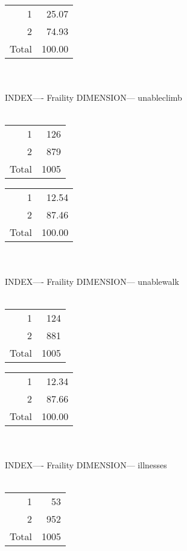 \documentclass[11pt]{article}
\begin{document}
% 
\begin{tabular}{rr}
   \hline
1 & 25.07 \\ 
  2 & 74.93 \\ 
  Total & 100.00 \\ 
   \hline
\end{tabular}
\\\\ 
INDEX---- Fraility DIMENSION--- unableclimb 
 \\\\ 
% 
\begin{tabular}{rr}
   \hline
1 & 126 \\ 
  2 & 879 \\ 
  Total & 1005 \\ 
   \hline
\end{tabular}
% 
\begin{tabular}{rr}
   \hline
1 & 12.54 \\ 
  2 & 87.46 \\ 
  Total & 100.00 \\ 
   \hline
\end{tabular}
\\\\ 
INDEX---- Fraility DIMENSION--- unablewalk 
 \\\\ 
% 
\begin{tabular}{rr}
   \hline
1 & 124 \\ 
  2 & 881 \\ 
  Total & 1005 \\ 
   \hline
\end{tabular}
% 
\begin{tabular}{rr}
   \hline
1 & 12.34 \\ 
  2 & 87.66 \\ 
  Total & 100.00 \\ 
   \hline
\end{tabular}
\\\\ 
INDEX---- Fraility DIMENSION--- illnesses 
 \\\\ 
% 
\begin{tabular}{rr}
   \hline
1 &  53 \\ 
  2 & 952 \\ 
  Total & 1005 \\ 
   \hline
\end{tabular}
\end{document}
